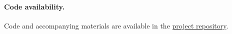 \paragraph{Code availability.}
Code and accompanying materials are available in the \href{https://github.com/Haoyi-Zhang/AndroidEvidence}{project repository}.
